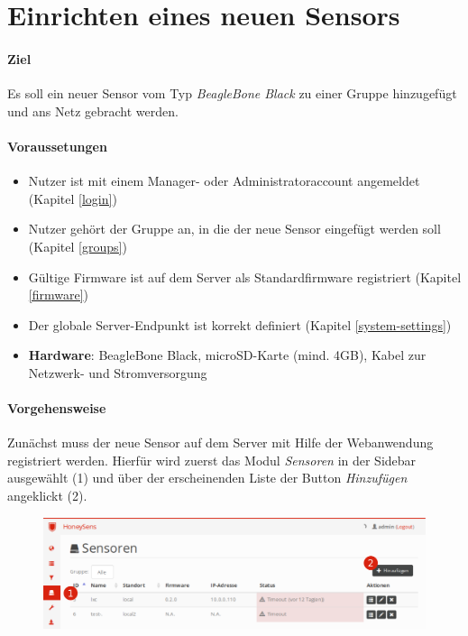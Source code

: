 \documentclass[12pt]{article}
\begin{document}
\section{Einrichten eines neuen Sensors}
\paragraph{Ziel}
Es soll ein neuer Sensor vom Typ \textit{BeagleBone Black} zu einer Gruppe hinzugefügt und ans Netz gebracht werden.
\paragraph{Voraussetungen}
\begin{itemize}
				\item Nutzer ist mit einem Manager- oder Administratoraccount angemeldet (Kapitel \ref{login})
				\item Nutzer gehört der Gruppe an, in die der neue Sensor eingefügt werden soll (Kapitel \ref{groups})
				\item Gültige Firmware ist auf dem Server als Standardfirmware registriert (Kapitel \ref{firmware})
				\item Der globale Server-Endpunkt ist korrekt definiert (Kapitel \ref{system-settings})
				\item \textbf{Hardware}: BeagleBone Black, microSD-Karte (mind. 4GB), Kabel zur Netzwerk- und Stromversorgung
\end{itemize}
\paragraph{Vorgehensweise}
Zunächst muss der neue Sensor auf dem Server mit Hilfe der Webanwendung registriert werden. Hierfür wird zuerst das Modul \textit{Sensoren} in der Sidebar ausgewählt (1) und über der erscheinenden Liste der Button \textit{Hinzufügen} angeklickt (2).

\begin{figure}[h]
				\centering
				\includegraphics[width=\textwidth]{./graphics/howto-sensor-add-1.png}
				\label{fig:howto-sensor-add-1}
\end{figure}
\end{document}
